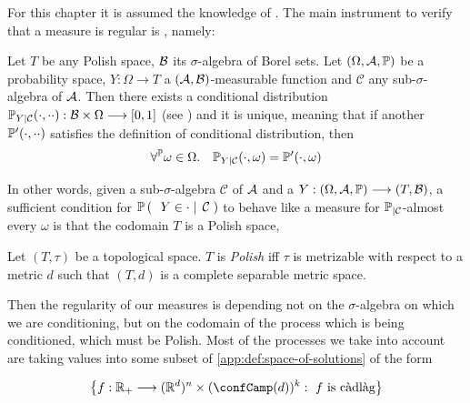 For this chapter it is assumed the knowledge of \cite[Section 10.2]{dudley}.
The main instrument to verify that a measure is regular is \cite[Theorem 10.2.2]{dudley}, namely:

\begin{theorem}
	Let $T$ be any Polish space, $\mathcal{B}$ its $\sigma$-algebra of Borel sets.
	Let $(\Omega, \mathcal{A}, \mathbb{P})$ be a probability space, $Y:\Omega\longrightarrow T$ a $(\mathcal{A},\mathcal{B})$-measurable function and $\mathcal{C}$ any sub-$\sigma$-algebra of $\mathcal{A}$.
	Then there exists a conditional distribution $\mathbb{P}_{Y|\mathcal{C}}(\cdot, \cdot \cdot):\mathcal{B} \times \Omega \longrightarrow [0,1]$ (see \cite[Chapter 10.2,first definition]{dudley}) and it is unique, meaning that if another $\mathbb{P}'(\cdot, \cdot \cdot)$ satisfies the definition of conditional distribution, then
	\begin{equation*}
		\forall^{\mathbb{P}} \omega\in\Omega.
		\quad
		\mathbb{P}_{Y|\mathcal{C}}(\cdot, \omega) = \mathbb{P}'(\cdot, \omega)
	\end{equation*}
\end{theorem}

In other words, given a sub-$\sigma$-algebra $\mathcal{C}$ of $\mathcal{A}$ and a \rv $Y:(\Omega, \mathcal{A}, \mathbb{P}) \longrightarrow (T,\mathcal{B})$, a sufficient condition for $\mathbb{P} \left( \; \left. \; Y \in \cdot \; \right| \; \mathcal{C}  \; \right)$ to behave like a measure for $\mathbb{P}_{|\mathcal{C}}$-almost every $\omega$ is that the codomain $T$ is a Polish space, \ie

\begin{definition}
	Let $(T, \tau)$ be a topological space. $T$ is \emph{Polish} iff $\tau$ is metrizable with respect to a metric $d$ such that $(T,d)$ is a complete separable metric space.
\end{definition}

Then the regularity of our measures is depending not on the $\sigma$-algebra on which we are conditioning, but on the codomain of the process which is being conditioned, which must be Polish.
Most of the processes we take into account are taking values into some subset of \ref{app:def:space-of-solutions} of the form

\begin{equation*}
	\left\{
	f:\R_+ \longrightarrow
	(\R^d)^n\times(\confCamp(d))^k
	:\
	f \text{ is \cadlag}
	\right\}
\end{equation*}

